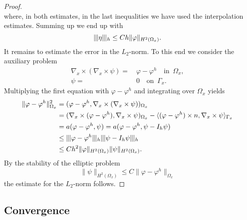 \documentclass[reqno,a4paper]{amsart}
\theoremstyle{remark}
\numberwithin{equation}{section}
\newcommand{\norm}[1]{\|#1\|}
\newcommand{\Tnorm}[1]{|\mkern-1mu|\mkern-1mu|#1|\mkern-1mu|\mkern-1mu|}
\newcommand{\sprod}[2]{\langle #1, #2 \rangle}
\def\curl{\nabla_x \times }
\def\fii{\varphi}
\begin{document}
\begin{proof}
\[\]
where, in both estimates, in the last inequalities 
we have used the interpolation  estimates. 
Summing up we end up with 
\[
\Tnorm{\eta}_h \leq C h \norm{\fii}_{H^2(\Omega_x)}.
\]
It remains to estimate the error in the $ L_2 $-norm. To this end 
we consider the auxiliary problem
\[
\begin{aligned}
\curl ( \curl \psi ) =& \, \fii - \fii^h \quad \mbox{in} \,\,\, \Omega_x, \\
\psi =& \, 0 \quad \mbox{on} \,\,\, \Gamma_x.
\end{aligned}
\]
Multiplying the first equation with $ \fii - \fii^h $ and integrating 
over $\Omega_x$ yields 
\[
\begin{aligned}
\norm{\fii - \fii^h}^2_{\Omega_x} &= ( \fii - \fii^h, \curl (\curl \psi))_{\Omega_x} \\
&= (\curl (\fii - \fii^h), \curl \psi)_{\Omega_x} - \sprod{(\fii - \fii^h) \times n}{\curl \psi}_{\Gamma_x} \\
&= a(\fii - \fii^h, \psi) = a(\fii - \fii^h, \psi - I_h \psi) \\
&\leq \Tnorm{\fii - \fii^h}_h \Tnorm{\psi - I_h \psi}_h \\
&\leq C h^2 \norm{\fii}_{H^2(\Omega_x)} \norm{\psi}_{H^2(\Omega_x)}.
\end{aligned}
\]
By the stability of the elliptic problem 
\[
\norm{\psi}_{H^2(\Omega_x)} \leq C \norm{\fii - \fii^h}_{\Omega_x}
\]
the estimate for the $ L_2 $-norm follows.
\end{proof}

\subsection{Convergence}
\end{document}
